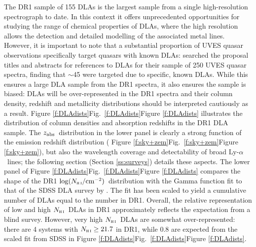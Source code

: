 \documentclass[fleqn,usenatbib,usedcolumn]{mnras}
\newcommand{\Sref}[1]{Section \ref{#1}}
\newcommand{\Fref}[1]{\ifhmode \ifnum\spacefactor=1001 Figure \ref{#1}\else Fig.\ \ref{#1}\fi \else Figure \ref{#1}\fi}
\newcommand{\lya}{\ensuremath{\textrm{Ly-}\alpha}}
\newcommand{\zab}{\ensuremath{z_\textrm{\scriptsize abs}}}
\newcommand{\NHI}{\ensuremath{N_\textsc{h\scriptsize{\,i}}}}
\newcommand{\lNHI}{\ensuremath{\log(N_\textsc{h\scriptsize{\,i}}/\textrm{cm}^{-2})}}
\begin{document}
The DR1 sample of 155 DLAs is the largest sample from a single high-resolution spectrograph to date. In this context it offers unprecedented opportunities for studying the range of chemical properties of DLAs, where the high resolution allows the detection and detailed modelling of the associated metal lines. However, it is important to note that a substantial proportion of UVES quasar observations specifically target quasars with known DLAs: \citet{Zafar:2013:A141} searched the proposal titles and abstracts for references to DLAs for their sample of 250 UVES quasar spectra, finding that $\sim$45 were targeted due to specific, known DLAs. While this ensures a large DLA sample from the DR1 spectra, it also ensures the sample is biased: DLAs will be over-represented in the DR1 spectra and their column density, redshift and metallicity distributions should be interpreted cautiously as a result. \Fref{f:DLAdists} illustrates the distribution of  column densities and absorption redshifts in the DR1 DLA sample. The \zab\ distribution in the lower panel is clearly a strong function of the emission redshift distribution (\Fref{f:sky+zem}), but also the wavelength coverage and detectability of broad \lya\ lines; the following section (\Sref{ss:surveys}) details these aspects. The lower panel of \Fref{f:DLAdists} compares the shape of the DR1 \lNHI\ distribution with the Gamma function fit to that of the SDSS DLA survey by \citet{Noterdaeme:2009:1087}. The fit has been scaled to yield a cumulative number of DLAs equal to the number in DR1. Overall, the relative representation of low and high \NHI\ DLAs in DR1 approximately reflects the expectation from a blind survey. However, very high \NHI\ DLAs are somewhat over-represented: there are 4 systems with $\NHI\ge21.7$ in DR1, while 0.8 are expected from the scaled fit from SDSS in \Fref{f:DLAdists}.
\end{document}
